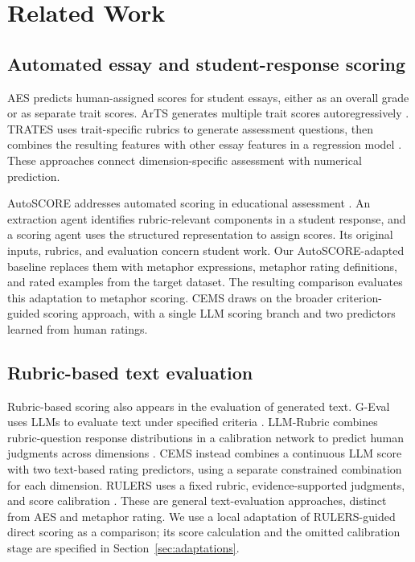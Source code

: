 \section{Related Work}

\subsection{Automated essay and student-response scoring}

AES predicts human-assigned scores for student essays, either as an overall grade or as separate trait scores. ArTS generates multiple trait scores autoregressively \citep{do2024arts}. TRATES uses trait-specific rubrics to generate assessment questions, then combines the resulting features with other essay features in a regression model \citep{eltanbouly2025trates}. These approaches connect dimension-specific assessment with numerical prediction.

AutoSCORE addresses automated scoring in educational assessment \citep{wang2026autoscore}. An extraction agent identifies rubric-relevant components in a student response, and a scoring agent uses the structured representation to assign scores. Its original inputs, rubrics, and evaluation concern student work. Our AutoSCORE-adapted baseline replaces them with metaphor expressions, metaphor rating definitions, and rated examples from the target dataset. The resulting comparison evaluates this adaptation to metaphor scoring. CEMS draws on the broader criterion-guided scoring approach, with a single LLM scoring branch and two predictors learned from human ratings.

\subsection{Rubric-based text evaluation}

Rubric-based scoring also appears in the evaluation of generated text. G-Eval uses LLMs to evaluate text under specified criteria \citep{liu-etal-2023-g}. LLM-Rubric combines rubric-question response distributions in a calibration network to predict human judgments across dimensions \citep{hashemi2024llmrubric}. CEMS instead combines a continuous LLM score with two text-based rating predictors, using a separate constrained combination for each dimension. RULERS uses a fixed rubric, evidence-supported judgments, and score calibration \citep{hong2026rulers}. These are general text-evaluation approaches, distinct from AES and metaphor rating. We use a local adaptation of RULERS-guided direct scoring as a comparison; its score calculation and the omitted calibration stage are specified in Section~\ref{sec:adaptations}.

